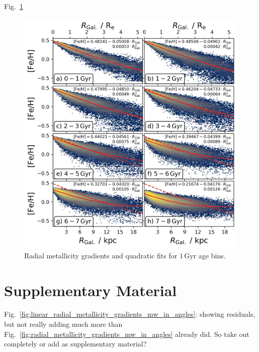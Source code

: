 \documentclass[fleqn,usenatbib]{mnras}
\begin{document}
Fig.~\ref{fig:quadratic_fit_across_ages}

\begin{figure}
    \centering
    \includegraphics[width=\columnwidth]{figures/quadratic_fit_across_ages.png}
    \caption{Radial metallicity gradients and quadratic fits for $1\,\mathrm{Gyr}$ age bins.}
    \label{fig:quadratic_fit_across_ages}
\end{figure}

\section{Supplementary Material} \label{sec:appendix_supplementary_material}

Fig.~\ref{fig:linear_radial_metallicity_gradients_mw_in_angles}: showing residuals, but not really adding much more than Fig.~\ref{fig:radial_metallicity_gradients_mw_in_angles} already did. So take out completely or add as supplementary material?
\end{document}
